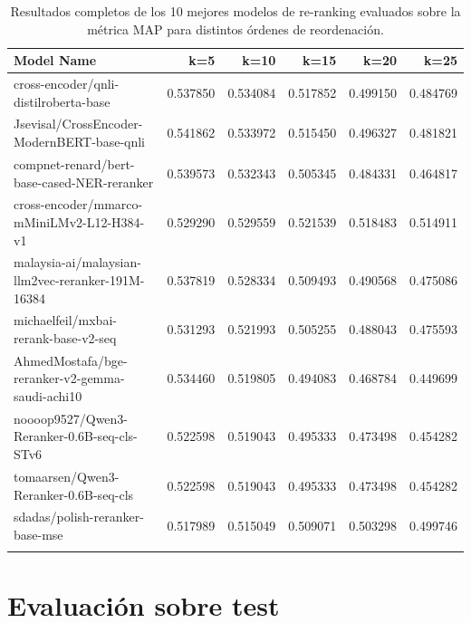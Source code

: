 \begin{landscape}
    \begin{xltabular}{\linewidth}{X rrrrr}
        \hline
        \textbf{Model Name}                               & \textbf{k=5} & \textbf{k=10} & \textbf{k=15} & \textbf{k=20} & \textbf{k=25} \\
        \hline
        cross-encoder/qnli-distilroberta-base             & 0.537850     & 0.534084      & 0.517852      & 0.499150      & 0.484769      \\
        Jsevisal/CrossEncoder-ModernBERT-base-qnli        & 0.541862     & 0.533972      & 0.515450      & 0.496327      & 0.481821      \\
        compnet-renard/bert-base-cased-NER-reranker       & 0.539573     & 0.532343      & 0.505345      & 0.484331      & 0.464817      \\
        cross-encoder/mmarco-mMiniLMv2-L12-H384-v1        & 0.529290     & 0.529559      & 0.521539      & 0.518483      & 0.514911      \\
        malaysia-ai/malaysian-llm2vec-reranker-191M-16384 & 0.537819     & 0.528334      & 0.509493      & 0.490568      & 0.475086      \\
        michaelfeil/mxbai-rerank-base-v2-seq              & 0.531293     & 0.521993      & 0.505255      & 0.488043      & 0.475593      \\
        AhmedMostafa/bge-reranker-v2-gemma-saudi-achi10   & 0.534460     & 0.519805      & 0.494083      & 0.468784      & 0.449699      \\
        noooop9527/Qwen3-Reranker-0.6B-seq-cls-STv6       & 0.522598     & 0.519043      & 0.495333      & 0.473498      & 0.454282      \\
        tomaarsen/Qwen3-Reranker-0.6B-seq-cls             & 0.522598     & 0.519043      & 0.495333      & 0.473498      & 0.454282      \\
        sdadas/polish-reranker-base-mse                   & 0.517989     & 0.515049      & 0.509071      & 0.503298      & 0.499746      \\
        \hline
        \caption{Resultados completos de los 10 mejores modelos de re-ranking evaluados sobre la métrica \gls{MAP} para distintos órdenes de reordenación.}
    \end{xltabular}
    \label{tab:cross_encoder_top10}
\end{landscape}


\section{Evaluación sobre test}



